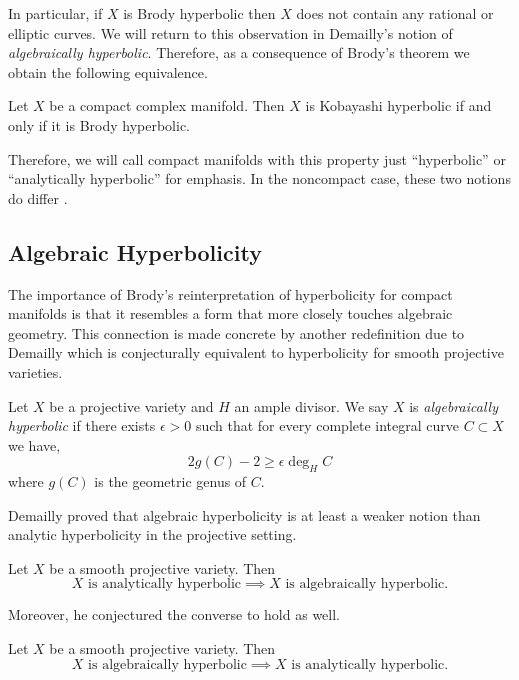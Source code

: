 \documentclass[main.tex]{subfiles}
\begin{document}
In particular, if $X$ is Brody hyperbolic then $X$ does not contain any rational or elliptic curves. We will return to this observation in Demailly's notion of \textit{algebraically hyperbolic}. Therefore, as a consequence of Brody's theorem we obtain the following equivalence.

\begin{theorem}[Brody]
Let $X$ be a compact complex manifold. Then $X$ is Kobayashi hyperbolic if and only if it is Brody hyperbolic.
\end{theorem}

Therefore, we will call compact manifolds with this property just ``hyperbolic'' or ``analytically hyperbolic'' for emphasis. In the noncompact case, these two notions do differ \cite{barth:domains_hyperbolicity}. 

\subsection{Algebraic Hyperbolicity}

The importance of Brody's reinterpretation of hyperbolicity for compact manifolds is that it resembles a form that more closely touches algebraic geometry. This connection is made concrete by another redefinition due to Demailly which is conjecturally equivalent to hyperbolicity for smooth projective varieties.

\begin{defn}
Let $X$ be a projective variety and $H$ an ample divisor. We say $X$ is \textit{algebraically hyperbolic} if there exists $\epsilon > 0$ such that for every complete integral curve $C \subset X$ we have,
\[ 2 g(C) - 2 \ge \epsilon \deg_H{C} \]
where $g(C)$ is the geometric genus of $C$.
\end{defn}

Demailly proved that algebraic hyperbolicity is at least a weaker notion than analytic hyperbolicity in the projective setting.

\begin{theorem}[Demailly]
Let $X$ be a smooth projective variety. Then
\[ X \text{ is analytically hyperbolic} \implies X \text{ is algebraically hyperbolic}. \]
\end{theorem}

Moreover, he conjectured the converse to hold as well.

\begin{conj}[Demailly]
Let $X$ be a smooth projective variety. Then
\[ X \text{ is algebraically hyperbolic} \implies X \text{ is analytically hyperbolic}. \]
\end{conj}
\end{document}
